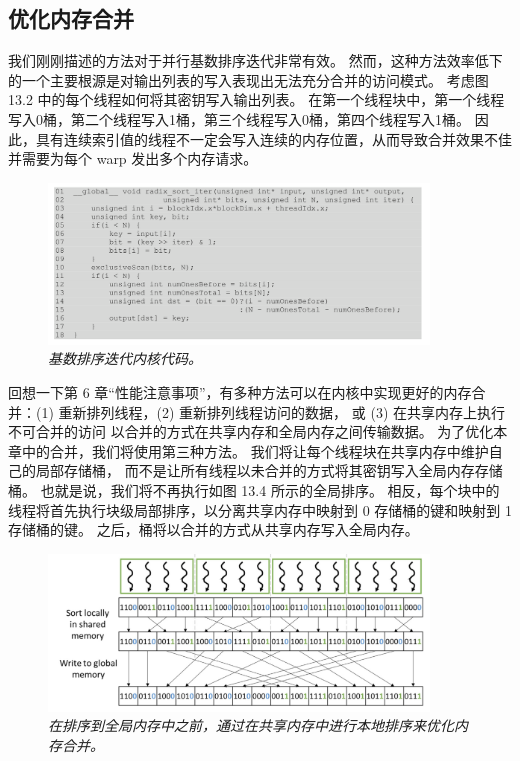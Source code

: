 \subsection{优化内存合并}
我们刚刚描述的方法对于并行基数排序迭代非常有效。 
然而，这种方法效率低下的一个主要根源是对输出列表的写入表现出无法充分合并的访问模式。 
考虑图 13.2 中的每个线程如何将其密钥写入输出列表。 
在第一个线程块中，第一个线程写入0桶，第二个线程写入1桶，第三个线程写入0桶，第四个线程写入1桶。 
因此，具有连续索引值的线程不一定会写入连续的内存位置，从而导致合并效果不佳并需要为每个 warp 发出多个内存请求。

\begin{figure}[H]
	\centering
	\includegraphics[width=0.9\textwidth]{figs/F13.4.png}
	\caption{\textit{基数排序迭代内核代码。}}
\end{figure}

回想一下第 6 章“性能注意事项”，有多种方法可以在内核中实现更好的内存合并：(1) 重新排列线程，(2) 重新排列线程访问的数据，
或 (3) 在共享内存上执行不可合并的访问 以合并的方式在共享内存和全局内存之间传输数据。 
为了优化本章中的合并，我们将使用第三种方法。 我们将让每个线程块在共享内存中维护自己的局部存储桶，
而不是让所有线程以未合并的方式将其密钥写入全局内存存储桶。 也就是说，我们将不再执行如图 13.4 所示的全局排序。 
相反，每个块中的线程将首先执行块级局部排序，以分离共享内存中映射到 0 存储桶的键和映射到 1 存储桶的键。 
之后，桶将以合并的方式从共享内存写入全局内存。

\begin{figure}[H]
	\centering
	\includegraphics[width=0.9\textwidth]{figs/F13.5.png}
	\caption{\textit{在排序到全局内存中之前，通过在共享内存中进行本地排序来优化内存合并。}}
\end{figure}

